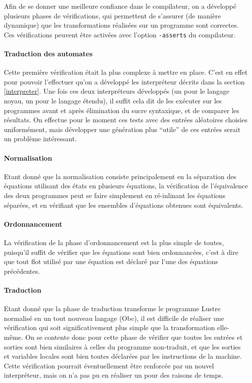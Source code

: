 \documentclass{article}
\begin{document}
Afin de se donner une meilleure confiance dans le compilateur, on a développé plusieurs phases de vérifications, qui permettent de s'assurer (de manière dynamique) que les transformations réalisées sur un programme sont correctes. Ces vérifications peuvent être activées avec l'option \texttt{-asserts} du compilateur.

\paragraph{Traduction des automates}
Cette première vérification était la plus complexe à mettre en place. C'est en effet pour pouvoir l'effectuer qu'on a développé les interpréteur décrits dans la section \ref{interpreter}. Une fois ces deux interpréteurs développés (un pour le langage noyau, un pour le langage étendu), il suffit cela dit de les exécuter sur les programmes avant et après élimination du sucre syntaxique, et de comparer les résultats. On effectue pour le moment ces tests avec des entrées aléatoires choisies uniformément, mais développer une génération plus ``utile'' de ces entrées serait un problème intéressant.

\paragraph{Normalisation}
Etant donné que la normalisation consiste principalement en la séparation des équations utilisant des états en plusieurs équations, la vérification de l'équivalence des deux programmes peut se faire simplement en ré-inlinant les équations séparées, et en vérifiant que les ensembles d'équations obtenues sont équivalents.

\paragraph{Ordonnancement}
La vérification de la phase d'ordonnancement est la plus simple de toutes, puisqu'il suffit de vérifier que les équations sont bien ordonnancées, c'est à dire que tout flot utilisé par une équation est déclaré par l'une des équations précédentes.

\paragraph{Traduction} Etant donné que la phase de traduction transforme le programme Lustre normalisé en un tout nouveau langage (Obc), il est difficile de réaliser une vérification qui soit significativement plus simple que la transformation elle-même. On se contente donc pour cette phase de vérifier que toutes les entrées et sorties sont bien similaires à celles du programme non-traduit, et que les sorties et variables locales sont bien toutes déclarées par les instructions de la machine. Cette vérification pourrait éventuellement être renforcée par un nouvel interpréteur, mais on n'a pas pu en réaliser un pour des raisons de temps.

{}

\end{document}
